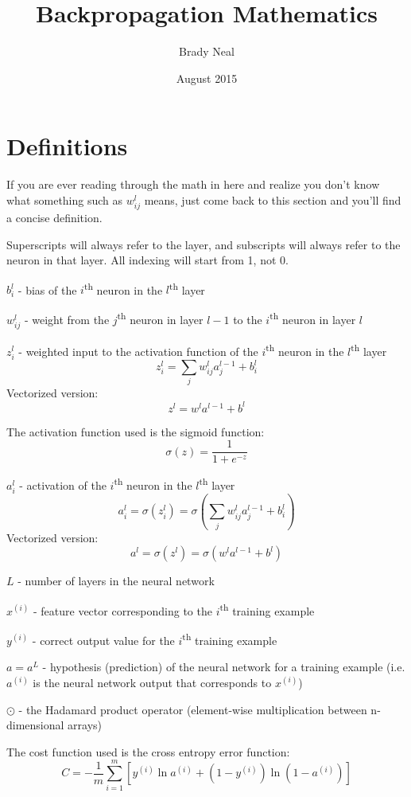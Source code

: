 \documentclass[11pt]{article}
\title{Backpropagation Mathematics}
\author{Brady Neal}
\date{August 2015}
\begin{document}
\maketitle

\section{Definitions}

If you are ever reading through the math in here and realize you don't know what something such as $w_{ij}^l$ means, just come back to this section and you'll find a concise definition.

Superscripts will always refer to the layer, and subscripts will always refer to the neuron in that layer. All indexing will start from 1, not 0.

$b_i^l$ - bias of the $i$\textsuperscript{th} neuron in the $l$\textsuperscript{th} layer

$w_{ij}^l$ - weight from the $j$\textsuperscript{th} neuron in layer $l - 1$ to the $i$\textsuperscript{th} neuron in layer $l$

$z_i^l$ - weighted input to the activation function of the $i$\textsuperscript{th} neuron in the $l$\textsuperscript{th} layer
\[z_i^l = \sum_j w_{ij}^l a_j^{l - 1} + b_i^l\]
Vectorized version:
\[z^l = w^l a^{l - 1} + b^l\]

The activation function used is the sigmoid function:
\[\sigma(z) = \frac{1}{1 + e^{-z}}\]

$a_i^l$ - activation of the $i$\textsuperscript{th} neuron in the $l$\textsuperscript{th} layer
\[a_i^l = \sigma(z_i^l) = \sigma\left(\sum_j w_{ij}^l a_j^{l - 1} + b_i^l\right)\]
Vectorized version:
\[a^l = \sigma(z^l) = \sigma(w^l a^{l - 1} + b^l)\]

$L$ - number of layers in the neural network

$x^{(i)}$ - feature vector corresponding to the $i$\textsuperscript{th} training example

$y^{(i)}$ - correct output value for the $i$\textsuperscript{th} training example

$a = a^L$ - hypothesis (prediction) of the neural network for a training example (i.e. $a^{(i)}$ is the neural network output that corresponds to $x^{(i)}$)

$\odot$ - the Hadamard product operator (element-wise multiplication between n-dimensional arrays)

The cost function used is the cross entropy error function:
\[C = - \frac{1}{m} \sum_{i = 1}^m \left[y^{(i)} \ln a^{(i)} + (1 - y^{(i)}) \ln \left(1 - a^{(i)}\right)\right]\]
\end{document}
